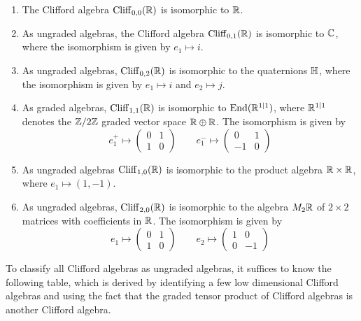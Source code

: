 \begin{exmp}\enumbreak
\begin{enumerate}
\item The Clifford algebra $\operatorname{Cliff}_{0,0}(\mathbb{R})$ is isomorphic to $\mathbb{R}$.
\item As ungraded algebras, the Clifford algebra $\operatorname{Cliff}_{0,1}(\mathbb{R})$ is isomorphic
      to $\mathbb{C}$, where the isomorphism is given by $e_1 \mapsto i$.
\item As ungraded algebras, $\operatorname{Cliff}_{0,2}(\mathbb{R})$ is isomorphic to the quaternions
      $\mathbb{H}$, where the isomorphism is given by $e_1 \mapsto i$ and $e_2 \mapsto j$.
\item As graded algebras, $\operatorname{Cliff}_{1,1}(\mathbb{R})$ is isomorphic to $\operatorname{End}(\mathbb{R}^{1|1})$,
      where $\mathbb{R}^{1|1}$ denotes the $\mathbb{Z}/2\mathbb{Z}$ graded vector space $\mathbb{R} \oplus \mathbb{R}$.
      The isomorphism is given by
      \[
       e_1^+ \mapsto \begin{pmatrix}
       0 & 1 \\
       1 & 0
       \end{pmatrix} \qquad e_1^- \mapsto \begin{pmatrix}
       0 & 1 \\
       -1 & 0
       \end{pmatrix}
      \]
\item As ungraded algebras $\operatorname{Cliff}_{1,0}(\mathbb{R})$ is isomorphic to the product
      algebra $\mathbb{R} \times \mathbb{R}$, where $e_1 \mapsto (1,-1)$.
\item As ungraded algebras, $\operatorname{Cliff}_{2,0}(\mathbb{R})$ is isomorphic to the algebra $M_2\mathbb{R}$
      of $2 \times 2$ matrices with coefficients in $\mathbb{R}$. The isomorphism is given by
      \[
       e_1 \mapsto \begin{pmatrix}
       0 & 1 \\
       1 & 0
       \end{pmatrix} \qquad e_2 \mapsto \begin{pmatrix}
       1 & 0 \\
       0 & -1
       \end{pmatrix}
      \]
      \qedhere\end{enumerate}
\end{exmp}
%
To classify all Clifford algebras as ungraded algebras, it suffices to know
the following table, which is derived by identifying a few low dimensional
Clifford algebras and using the fact that the graded tensor product of
Clifford algebras is another Clifford algebra. \\\\
